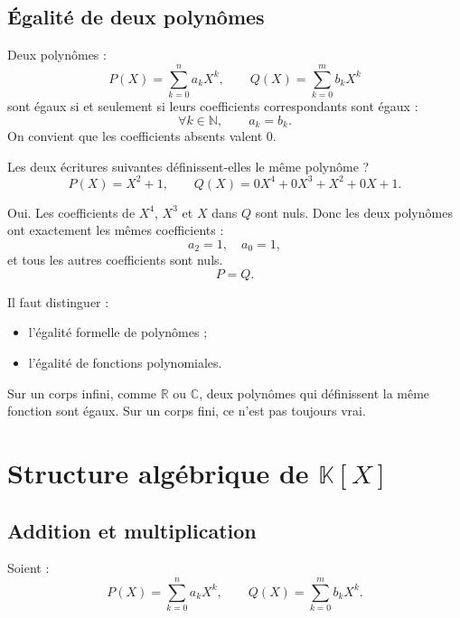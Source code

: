 \documentclass[11pt,a4paper]{article}
\newcommand{\K}{\mathbb K}
\newcommand{\R}{\mathbb R}
\newcommand{\C}{\mathbb C}
\newcommand{\N}{\mathbb N}
\begin{document}
\subsection{Égalité de deux polynômes}

\begin{definitionbox}
Deux polynômes :
\[
P(X)=\sum_{k=0}^n a_kX^k,
\qquad
Q(X)=\sum_{k=0}^m b_kX^k
\]
sont égaux si et seulement si leurs coefficients correspondants sont égaux :
\[
\forall k\in\N,\qquad a_k=b_k.
\]
On convient que les coefficients absents valent \(0\).
\end{definitionbox}

\begin{exercicebox}[Compréhension]
Les deux écritures suivantes définissent-elles le même polynôme ?
\[
P(X)=X^2+1,
\qquad
Q(X)=0X^4+0X^3+X^2+0X+1.
\]
\end{exercicebox}

\begin{correctionbox}
Oui. Les coefficients de \(X^4\), \(X^3\) et \(X\) dans \(Q\) sont nuls.  
Donc les deux polynômes ont exactement les mêmes coefficients :
\[
a_2=1,\quad a_0=1,
\]
et tous les autres coefficients sont nuls.
\[
P=Q.
\]
\end{correctionbox}

\begin{erreurbox}
Il faut distinguer :
\begin{itemize}
    \item l'égalité formelle de polynômes ;
    \item l'égalité de fonctions polynomiales.
\end{itemize}

Sur un corps infini, comme \(\R\) ou \(\C\), deux polynômes qui définissent la même fonction sont égaux.  
Sur un corps fini, ce n'est pas toujours vrai.
\end{erreurbox}

\section{Structure algébrique de \(\K[X]\)}

\subsection{Addition et multiplication}

Soient :
\[
P(X)=\sum_{k=0}^n a_kX^k,
\qquad
Q(X)=\sum_{k=0}^m b_kX^k.
\]
\end{document}
